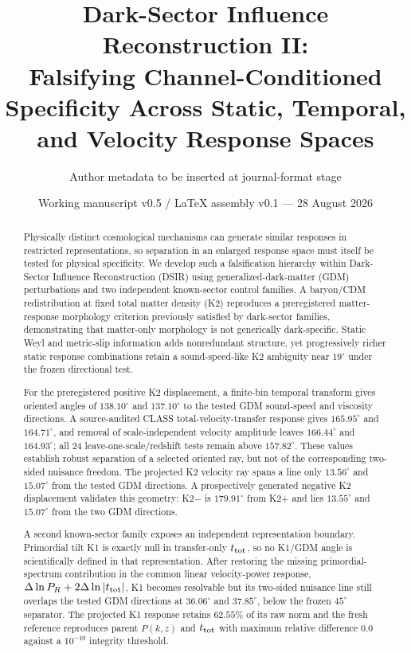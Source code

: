 \documentclass[11pt]{article}
\title{Dark-Sector Influence Reconstruction II:\\Falsifying Channel-Conditioned Specificity Across Static, Temporal, and Velocity Response Spaces}
\author{Author metadata to be inserted at journal-format stage}
\date{Working manuscript v0.5 / LaTeX assembly v0.1 --- 28 August 2026}
\newcommand{\ttot}{t_{\rm tot}}
\newcommand{\dln}{\Delta\ln}
\begin{document}
\maketitle

\begin{abstract}
Physically distinct cosmological mechanisms can generate similar responses in restricted representations, so separation in an enlarged response space must itself be tested for physical specificity. We develop such a falsification hierarchy within Dark-Sector Influence Reconstruction (DSIR) using generalized-dark-matter (GDM) perturbations and two independent known-sector control families. A baryon/CDM redistribution at fixed total matter density (K2) reproduces a preregistered matter-response morphology criterion previously satisfied by dark-sector families, demonstrating that matter-only morphology is not generically dark-specific. Static Weyl and metric-slip information adds nonredundant structure, yet progressively richer static response combinations retain a sound-speed-like K2 ambiguity near $19^\circ$ under the frozen directional test.

For the preregistered positive K2 displacement, a finite-bin temporal transform gives oriented angles of $138.10^\circ$ and $137.10^\circ$ to the tested GDM sound-speed and viscosity directions. A source-audited CLASS total-velocity-transfer response gives $165.95^\circ$ and $164.71^\circ$, and removal of scale-independent velocity amplitude leaves $166.44^\circ$ and $164.93^\circ$; all 24 leave-one-scale/redshift tests remain above $157.82^\circ$. These values establish robust separation of a selected oriented ray, but not of the corresponding two-sided nuisance freedom. The projected K2 velocity ray spans a line only $13.56^\circ$ and $15.07^\circ$ from the tested GDM directions. A prospectively generated negative K2 displacement validates this geometry: K2$-$ is $179.91^\circ$ from K2$+$ and lies $13.55^\circ$ and $15.07^\circ$ from the two GDM directions.

A second known-sector family exposes an independent representation boundary. Primordial tilt K1 is exactly null in transfer-only $\ttot$, so no K1/GDM angle is scientifically defined in that representation. After restoring the missing primordial-spectrum contribution in the common linear velocity-power response, $\dln P_R+2\dln|\ttot|$, K1 becomes resolvable but its two-sided nuisance line still overlaps the tested GDM directions at $36.06^\circ$ and $37.85^\circ$, below the frozen $45^\circ$ separator. The projected K1 response retains $62.55\%$ of its raw norm and the fresh reference reproduces parent $P(k,z)$ and $\ttot$ with maximum relative difference $0.0$ against a $10^{-10}$ integrity threshold.


\end{abstract}
\end{document}
